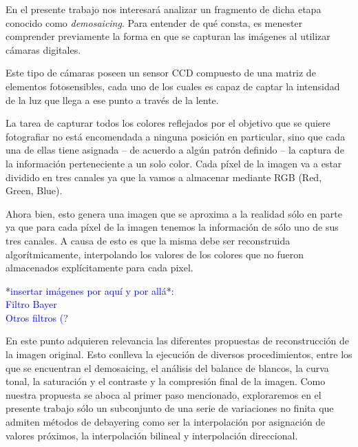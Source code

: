 \documentclass[a4paper]{article}
\begin{document}
En el presente trabajo nos interesará analizar un fragmento de dicha etapa conocido como \emph{demosaicing}. Para entender de qué consta, es menester comprender previamente la forma en que se capturan las imágenes al utilizar cámaras digitales.

Este tipo de cámaras poseen un sensor CCD compuesto de una matriz de elementos fotosensibles, cada uno de los cuales es capaz de captar la intensidad de la luz que llega a ese punto a través de la lente. 

La tarea de capturar todos los colores reflejados por el objetivo que se quiere fotografiar no está encomendada a ninguna posición en particular, sino que cada una de ellas tiene asignada – de acuerdo a algún patrón definido  – la captura de la información perteneciente a un solo color. Cada p\'ixel de la imagen va a estar dividido en tres canales ya que la vamos a almacenar mediante RGB (Red, Green, Blue).

Ahora bien, esto genera una imagen que se aproxima a la realidad sólo en parte ya que para cada p\'ixel de la imagen tenemos la informaci\'on de s\'olo uno de sus tres canales. A causa de esto es que la misma debe ser reconstruida algorítmicamente, interpolando los valores de los colores que no fueron almacenados explícitamente para cada pixel.


\textcolor{blue}{*insertar imágenes por aquí y por allá*:\\
Filtro Bayer \\
Otros filtros (?
}

En este punto adquieren relevancia las diferentes propuestas de reconstrucción de la imagen original. Esto conlleva la ejecución de diversos procedimientos, entre los que se encuentran el demosaicing, el análisis del balance de blancos, la curva tonal, la saturación y el contraste y la compresión final de la imagen. Como nuestra propuesta se aboca al primer paso mencionado, exploraremos en el presente trabajo sólo un subconjunto de una serie de variaciones no finita que admiten métodos de debayering como ser la interpolación por asignación de valores próximos, la interpolación bilineal y interpolación direccional.\\
\end{document}
